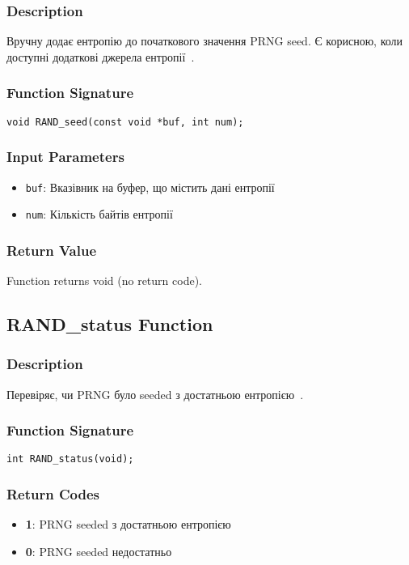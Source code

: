 \subsubsection{Description}
Вручну додає ентропію до початкового значення PRNG seed. Є корисною, коли доступні додаткові джерела 
ентропії~\cite{eastlake2005randomness}.

\subsubsection{Function Signature}
\begin{verbatim}
void RAND_seed(const void *buf, int num);
\end{verbatim}

\subsubsection{Input Parameters}
\begin{itemize}
    \item \texttt{buf}: Вказівник на буфер, що містить дані ентропії
    \item \texttt{num}: Кількість байтів ентропії
\end{itemize}

\subsubsection{Return Value}
Function returns void (no return code).

\subsection{RAND\_status Function}

\subsubsection{Description}
Перевіряє, чи PRNG було seeded з достатньою ентропією~\cite{openssl_manual}.

\subsubsection{Function Signature}
\begin{verbatim}
int RAND_status(void);
\end{verbatim}

\subsubsection{Return Codes}
\begin{itemize}
    \item \textbf{1}: PRNG seeded з достатньою ентропією
    \item \textbf{0}: PRNG seeded недостатньо
\end{itemize}

